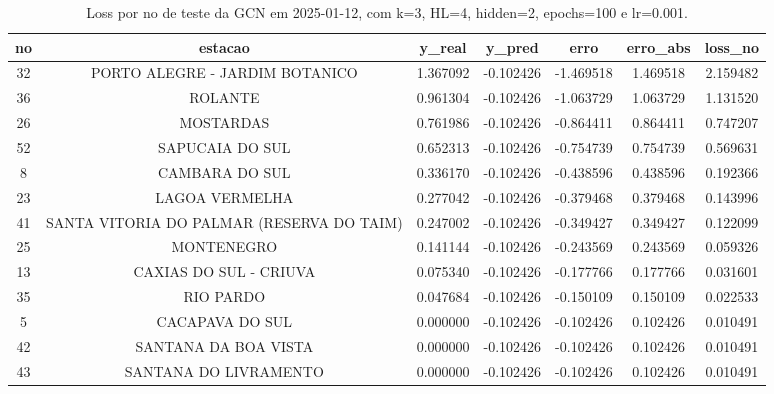 \begin{table}[h]
\centering
\caption{Loss por no de teste da GCN em 2025-01-12, com k=3, HL=4, hidden=2, epochs=100 e lr=0.001.}
\label{tab:gcn_loss_k3_hl4_h2_e100_d20250112}
\begin{tabular}{ccccccc}
\toprule
no & estacao & y\_real & y\_pred & erro & erro\_abs & loss\_no \\
\midrule
32 & PORTO ALEGRE - JARDIM BOTANICO & 1.367092 & -0.102426 & -1.469518 & 1.469518 & 2.159482 \\
36 & ROLANTE & 0.961304 & -0.102426 & -1.063729 & 1.063729 & 1.131520 \\
26 & MOSTARDAS & 0.761986 & -0.102426 & -0.864411 & 0.864411 & 0.747207 \\
52 & SAPUCAIA DO SUL & 0.652313 & -0.102426 & -0.754739 & 0.754739 & 0.569631 \\
8 & CAMBARA DO SUL & 0.336170 & -0.102426 & -0.438596 & 0.438596 & 0.192366 \\
23 & LAGOA VERMELHA & 0.277042 & -0.102426 & -0.379468 & 0.379468 & 0.143996 \\
41 & SANTA VITORIA DO PALMAR (RESERVA DO TAIM) & 0.247002 & -0.102426 & -0.349427 & 0.349427 & 0.122099 \\
25 & MONTENEGRO & 0.141144 & -0.102426 & -0.243569 & 0.243569 & 0.059326 \\
13 & CAXIAS DO SUL - CRIUVA & 0.075340 & -0.102426 & -0.177766 & 0.177766 & 0.031601 \\
35 & RIO PARDO & 0.047684 & -0.102426 & -0.150109 & 0.150109 & 0.022533 \\
5 & CACAPAVA DO SUL & 0.000000 & -0.102426 & -0.102426 & 0.102426 & 0.010491 \\
42 & SANTANA DA BOA VISTA & 0.000000 & -0.102426 & -0.102426 & 0.102426 & 0.010491 \\
43 & SANTANA DO LIVRAMENTO & 0.000000 & -0.102426 & -0.102426 & 0.102426 & 0.010491 \\
\bottomrule
\end{tabular}
\end{table}
